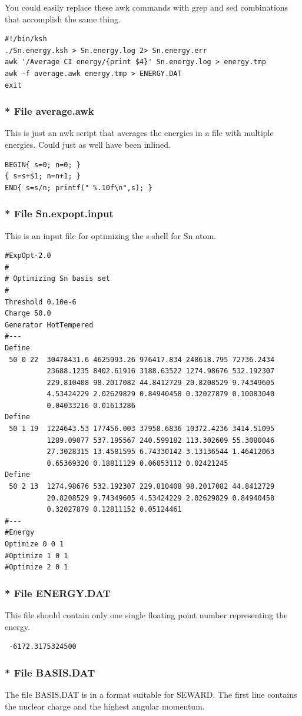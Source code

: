 \documentclass[a4paper,fleqn]{article}
\let\headii=\subsubsection
\def\file#1{{\sffamily\upshape\mdseries #1}}
\begin{document}
You could easily replace these awk commands with grep and sed combinations
that accomplish the same thing.
\begin{verbatim}
#!/bin/ksh
./Sn.energy.ksh > Sn.energy.log 2> Sn.energy.err
awk '/Average CI energy/{print $4}' Sn.energy.log > energy.tmp
awk -f average.awk energy.tmp > ENERGY.DAT
exit
\end{verbatim}
\headii{* File \file{average.awk}}
This is just an awk script that averages the energies in a file with multiple energies.
Could just as well have been inlined.
\begin{verbatim}
BEGIN{ s=0; n=0; }
{ s=s+$1; n=n+1; }
END{ s=s/n; printf(" %.10f\n",s); }
\end{verbatim}
\headii{* File \file{Sn.expopt.input}}
This is an input file for optimizing the s-shell for Sn atom.
\begin{verbatim}
#ExpOpt-2.0
#
# Optimizing Sn basis set
#
Threshold 0.10e-6
Charge 50.0
Generator HotTempered
#---
Define
 50 0 22  30478431.6 4625993.26 976417.834 248618.795 72736.2434 
          23688.1235 8402.61916 3188.63522 1274.98676 532.192307 
          229.810408 98.2017082 44.8412729 20.8208529 9.74349605 
          4.53424229 2.02629829 0.84940458 0.32027879 0.10083040
          0.04033216 0.01613286 
Define
 50 1 19  1224643.53 177456.003 37958.6836 10372.4236 3414.51095 
          1289.09077 537.195567 240.599182 113.302609 55.3080046 
          27.3028315 13.4581595 6.74330142 3.13136544 1.46412063 
          0.65369320 0.18811129 0.06053112 0.02421245
Define
 50 2 13  1274.98676 532.192307 229.810408 98.2017082 44.8412729 
          20.8208529 9.74349605 4.53424229 2.02629829 0.84940458 
          0.32027879 0.12811152 0.05124461
#---
#Energy
Optimize 0 0 1
#Optimize 1 0 1
#Optimize 2 0 1
\end{verbatim}
\headii{* File \file{ENERGY.DAT}}
This file should contain only one single floating point number representing the
energy.
\begin{verbatim}
 -6172.3175324500
\end{verbatim}
\headii{* File \file{BASIS.DAT}}
\label{sec:basis.dat}
The file \file{BASIS.DAT} is in a format suitable for SEWARD. The first line
contains the nuclear charge and the highest angular momentum.
\end{document}
